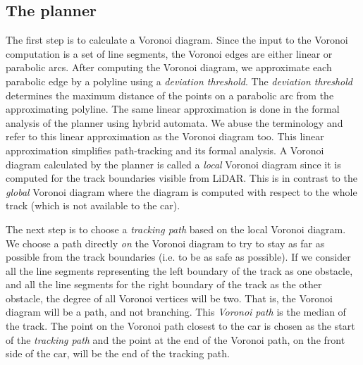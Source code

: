\subsection{The planner}
\label{sec:voronoiplanner}

The first step is to calculate a Voronoi diagram.
%
Since the input to the Voronoi computation is a set of line segments, the Voronoi edges are either linear or parabolic arcs.
%
After computing the Voronoi diagram, we approximate each parabolic edge by a polyline using a \emph{deviation threshold}.
%
The \emph{deviation threshold} determines the maximum distance of the points on a parabolic arc from the approximating polyline.
%
The same linear approximation is done in the formal analysis of the planner using hybrid automata.
%
We abuse the terminology and refer to this linear approximation as the Voronoi diagram too.
%
This linear approximation simplifies path-tracking and its formal analysis.
%
A Voronoi diagram calculated by the planner is called a \emph{local} Voronoi diagram since it is computed for the track boundaries visible from LiDAR.
%
This is in contrast to the \emph{global} Voronoi diagram where the diagram is computed with respect to the whole track (which is not available to the car).


The next step is to choose a \emph{tracking path} based on the local Voronoi diagram.
%
We choose a path directly \emph{on} the Voronoi diagram to try to stay as far as possible from the track boundaries (i.e. to be as safe as possible).
%
If we consider all the line segments representing the left boundary of the track as one obstacle, and all the line segments for the right boundary of the track as the other obstacle, the degree of all Voronoi vertices will be two.
%
That is, the Voronoi diagram will be a path, and not branching.
%
This \emph{Voronoi path} is the median of the track.
%
The point on the Voronoi path closest to the car is chosen as the start of the \emph{tracking path} and the point at the end of the Voronoi path, on the front side of the car, will be the end of the tracking path.
